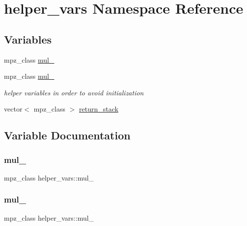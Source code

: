 \hypertarget{namespacehelper__vars}{}\section{helper\+\_\+vars Namespace Reference}
\label{namespacehelper__vars}
\subsection*{Variables}
\begin{DoxyCompactItemize}
\item 
mpz\+\_\+class \hyperlink{namespacehelper__vars_af190146bcb041e9501bb622fd0a70e1e}{mul\+\_}
\item 
mpz\+\_\+class \hyperlink{namespacehelper__vars_a3ef4720a3a8f70853c651c0bba5107b2}{mul\+\_}
\begin{DoxyCompactList}\small\item\em helper variables in order to avoid initialization \end{DoxyCompactList}\item 
vector$<$ mpz\+\_\+class $>$ \hyperlink{namespacehelper__vars_a36577c81e805c58ec2ec7ed63882317f}{return\+\_\+stack}
\end{DoxyCompactItemize}


\subsection{Variable Documentation}
\mbox{\label{namespacehelper__vars_af190146bcb041e9501bb622fd0a70e1e}} 
\subsubsection{\texorpdfstring{mul\+\_}{mul\_1}}
{\footnotesize\ttfamily mpz\+\_\+class helper\+\_\+vars\+::mul\+\_}

\mbox{\label{namespacehelper__vars_a3ef4720a3a8f70853c651c0bba5107b2}} 
\subsubsection{\texorpdfstring{mul\+\_}{mul\_2}}
{\footnotesize\ttfamily mpz\+\_\+class helper\+\_\+vars\+::mul\+\_}



